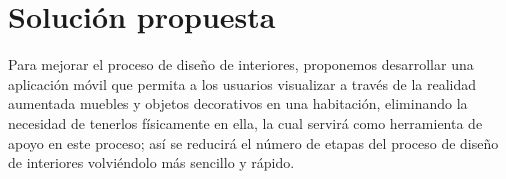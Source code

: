 \section{Solución propuesta}
Para mejorar el proceso de diseño de interiores, proponemos desarrollar una aplicación móvil que permita a los usuarios visualizar a través de la realidad aumentada muebles y objetos decorativos en una habitación, eliminando la necesidad de tenerlos físicamente en ella, la cual servirá como herramienta de apoyo en este proceso; así se reducirá el número de etapas del proceso de diseño de interiores volviéndolo más sencillo y rápido.

 